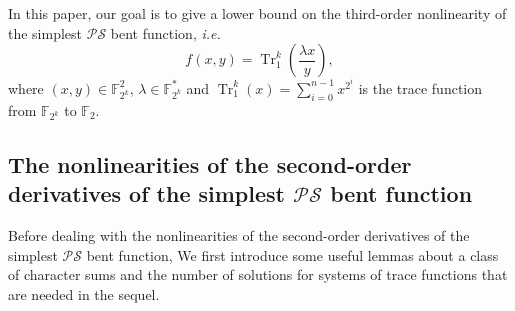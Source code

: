 \documentclass{article}
\newcommand{\F}{\mathbb{F}}
\newcommand{\0}{\textbf{0}}
\newcommand{\1}{\textbf{1}}
\newcommand{\TRACE}{\operatorname{Tr}_1^k}
\theoremstyle{plain}
\begin{document}
    In this paper, our goal is to give a lower bound on the third-order nonlinearity of the simplest 
    $ \mathcal{PS} $ bent function, \emph{i.e.}
    \begin{equation*}\label{sub-bent}
        f(x,y)=\TRACE\left(\frac{\lambda x}{y}\right),
    \end{equation*}
    where $ (x,y)\in\F_{2^k}^2 $, $ \lambda\in\F_{2^k}^{*} $ 
    and $ \TRACE(x)=\sum\limits_{i=0}^{n-1}x^{2^i} $ is the trace function from
    $ \F_{2^k} $ to $ \F_2 $.

    \subsection{The nonlinearities of the second-order derivatives of the simplest $ \mathcal{PS} $ bent function}

    Before dealing with the nonlinearities of the second-order derivatives of the simplest $ \mathcal{PS} $ bent function, 
    We first introduce some useful lemmas about a class of character sums and the number of solutions for systems of trace functions that are needed in the sequel.

\end{document}
